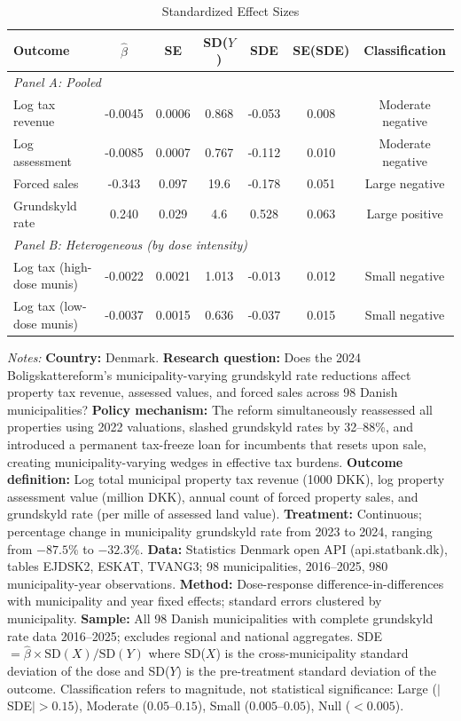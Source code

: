 \begin{table}[t]\begin{threeparttable}
\centering
\caption{Standardized Effect Sizes}
\label{tab:sde}
\small
\begin{tabular}{lcccccc}
\toprule
  Outcome & $\hat{\beta}$ & SE & SD($Y$) & SDE & SE(SDE) & Classification \\
\midrule
\multicolumn{7}{l}{\textit{Panel A: Pooled}} \\[3pt]
  Log tax revenue & -0.0045 & 0.0006 & 0.868 & -0.053 & 0.008 & Moderate negative \\
  Log assessment & -0.0085 & 0.0007 & 0.767 & -0.112 & 0.010 & Moderate negative \\
  Forced sales & -0.343 & 0.097 & 19.6 & -0.178 & 0.051 & Large negative \\
  Grundskyld rate & 0.240 & 0.029 & 4.6 & 0.528 & 0.063 & Large positive \\[6pt]
\multicolumn{7}{l}{\textit{Panel B: Heterogeneous (by dose intensity)}} \\[3pt]
  Log tax (high-dose munis) & -0.0022 & 0.0021 & 1.013 & -0.013 & 0.012 & Small negative \\
  Log tax (low-dose munis) & -0.0037 & 0.0015 & 0.636 & -0.037 & 0.015 & Small negative \\
\bottomrule
\end{tabular}
\begin{tablenotes}
\item \textit{Notes:} \textbf{Country:} Denmark. \textbf{Research question:} Does the 2024 Boligskattereform's municipality-varying grundskyld rate reductions affect property tax revenue, assessed values, and forced sales across 98 Danish municipalities? \textbf{Policy mechanism:} The reform simultaneously reassessed all properties using 2022 valuations, slashed grundskyld rates by 32--88\%, and introduced a permanent tax-freeze loan for incumbents that resets upon sale, creating municipality-varying wedges in effective tax burdens. \textbf{Outcome definition:} Log total municipal property tax revenue (1000 DKK), log property assessment value (million DKK), annual count of forced property sales, and grundskyld rate (per mille of assessed land value). \textbf{Treatment:} Continuous; percentage change in municipality grundskyld rate from 2023 to 2024, ranging from $-87.5\%$ to $-32.3\%$. \textbf{Data:} Statistics Denmark open API (api.statbank.dk), tables EJDSK2, ESKAT, TVANG3; 98 municipalities, 2016--2025, 980 municipality-year observations. \textbf{Method:} Dose-response difference-in-differences with municipality and year fixed effects; standard errors clustered by municipality. \textbf{Sample:} All 98 Danish municipalities with complete grundskyld rate data 2016--2025; excludes regional and national aggregates. SDE $= \hat{\beta} \times \text{SD}(X) / \text{SD}(Y)$ where SD($X$) is the cross-municipality standard deviation of the dose and SD($Y$) is the pre-treatment standard deviation of the outcome. Classification refers to magnitude, not statistical significance: Large ($|$SDE$| > 0.15$), Moderate ($0.05$--$0.15$), Small ($0.005$--$0.05$), Null ($< 0.005$).
\end{tablenotes}
\end{threeparttable}\end{table}
